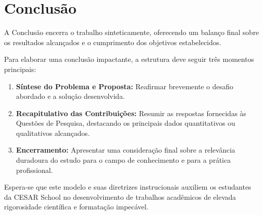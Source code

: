 \chapter{Conclusão}
\label{chap:conclusao}

A Conclusão encerra o trabalho sinteticamente, oferecendo um balanço final sobre os resultados alcançados e o cumprimento dos objetivos estabelecidos.

Para elaborar uma conclusão impactante, a estrutura deve seguir três momentos principais:
\begin{enumerate}
    \item \textbf{Síntese do Problema e Proposta:} Reafirmar brevemente o desafio abordado e a solução desenvolvida.
    \item \textbf{Recapitulativo das Contribuições:} Resumir as respostas fornecidas às Questões de Pesquisa, destacando os principais dados quantitativos ou qualitativos alcançados.
    \item \textbf{Encerramento:} Apresentar uma consideração final sobre a relevância duradoura do estudo para o campo de conhecimento e para a prática profissional.
\end{enumerate}

Espera-se que este modelo e suas diretrizes instrucionais auxiliem os estudantes da CESAR School no desenvolvimento de trabalhos acadêmicos de elevada rigorosidade científica e formatação impecável.
